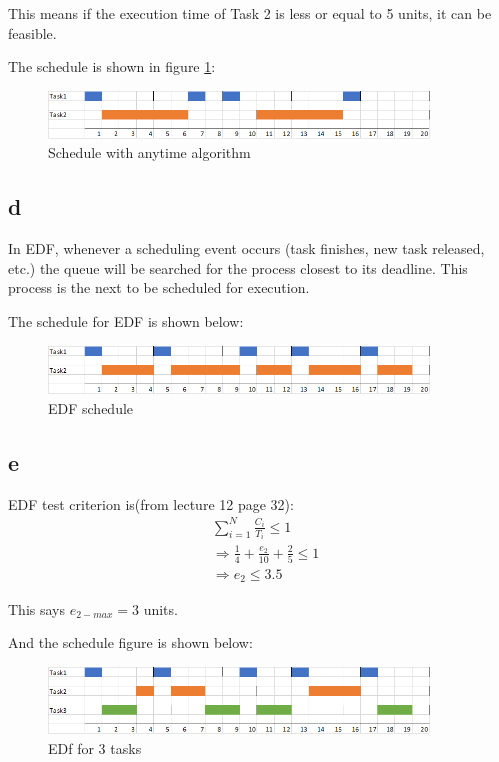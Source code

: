 This means if the execution time of Task 2 is less or equal to 5 units, it can be feasible.

The schedule is shown in figure \ref{c}:

\begin{figure}[H]
 \centering
 \includegraphics[width=0.9\textwidth]{images/anytime.png}
 \caption{Schedule with anytime algorithm}
 \label{c}
\end{figure}

\subsection{d}

In EDF, whenever a scheduling event occurs (task finishes, new task released, etc.) the queue will be searched for the process closest to its deadline. This process is the next to be scheduled for execution.

The schedule for EDF is shown below:

\begin{figure}[H]
 \centering
 \includegraphics[width=0.9\textwidth]{images/EDF.png}
 \caption{EDF schedule}
 \label{EDF}
\end{figure}

\subsection{e}
EDF test criterion is(from lecture 12 page 32):
\begin{equation}
    \begin{aligned}
        &\sum_{i=1}^N\frac{C_i}{T_i}\le1\\
        &\Rightarrow \frac{1}{4}+\frac{e_2}{10} +\frac{2}{5} \leq 1\\
        &\Rightarrow e_2 \leq 3.5
    \end{aligned}
\end{equation}

This says $ e_{2-max} = 3 $ units.

And the schedule figure is shown below:

\begin{figure}[H]
 \centering
 \includegraphics[width=0.9\textwidth]{images/EDFe.png}
 \caption{EDf for 3 tasks}
 \label{label}
\end{figure}
